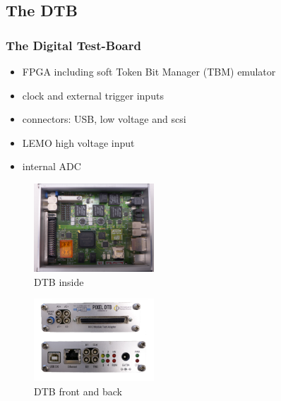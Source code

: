 \documentclass[9pt]{beamer}
\begin{document}
\subsection{The DTB}
\begin{frame}
	\frametitle{The Digital Test-Board}
	\begin{itemize}
		\item FPGA including soft Token Bit Manager (TBM) emulator
		\item clock and external trigger inputs
		\item connectors: USB, low voltage and scsi 
		\item LEMO high voltage input 
		\item internal ADC
	\end{itemize}
	\begin{center}
		\begin{minipage}{5cm}
			\centering
			\begin{figure}
				\caption{DTB inside}
				\includegraphics[width=4.5cm]{Pics/dtb_inside}
			\end{figure}
		\end{minipage}
		\hspace*{2pt}
		\begin{minipage}{5cm}
			\centering
			\begin{figure}
				\caption{DTB front and back}
				\includegraphics[width=4.5cm]{Pics/DTB-Sides}
			\end{figure}
		\end{minipage}\no\s
	\end{center}
\end{frame}
\end{document}
